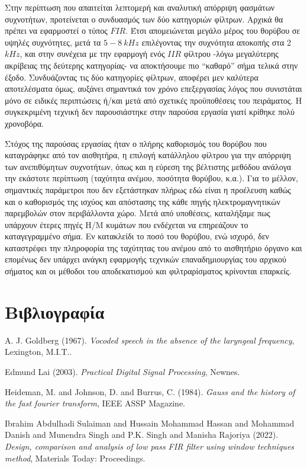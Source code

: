 \documentclass[breaklines=true, 12pt]{article}
\begin{document}
{{{Στην περίπτωση που απαιτείται λεπτομερή και αναλυτική απόρριψη φασμάτων
συχνοτήτων, προτείνεται ο συνδυασμός των δύο κατηγοριών φίλτρων. Αρχικά θα
πρέπει να εφαρμοστεί ο τύπος \(FIR\). Έτσι απομειώνεται μεγάλο μέρος του θορύβου
σε υψηλές συχνότητες, μετά τα \(5-8\ kHz\) επιλέγοντας την συχνότητα αποκοπής στα
2 \(kHz\), και στην συνέχεια με την εφαρμογή ενός \(IIR\) φίλτρου -λόγω μεγαλύτερης
ακρίβειας της δεύτερης κατηγορίας- να αποκτήσουμε πιο “καθαρό” σήμα τελικά στην
έξοδο. Συνδυάζοντας τις δύο κατηγορίες φίλτρων, αποφέρει μεν καλύτερα αποτελέσματα
όμως, αυξάνει σημαντικά τον χρόνο επεξεργασίας λόγος που συνιστάται μόνο σε
ειδικές περιπτώσεις ή/και μετά από σχετικές προϋποθέσεις του πειράματος. Η
συγκεκριμένη τεχνική δεν παρουσιάστηκε στην παρούσα εργασία γιατί κρίθηκε πολύ
χρονοβόρα.

Στόχος της παρούσας εργασίας ήταν ο πλήρης καθορισμός του θορύβου που
καταγράφηκε από τον αισθητήρα, η επιλογή κατάλληλου φίλτρου για την απόρριψη των
ανεπιθύμητων συχνοτήτων, όπως και η εύρεση της βέλτιστης μεθόδου ανάλογα την
εκάστοτε περίπτωση (ταχύτητα ανέμου, ποσότητα θορύβου, κ.α.). Για το μέλλον,
σημαντικές παράμετροι που δεν εξετάστηκαν πλήρως εδώ είναι η προέλευση καθώς και ο
καθορισμός της ισχύος και απόστασης της κάθε πηγής ηλεκτρομαγνητικών παρεμβολών
στον περιβάλλοντα χώρο. Μετά από υποθέσεις, καταλήξαμε πως υπάρχουν έτερες πηγές
Η/Μ κυμάτων που ενδέχεται να επηρεάζουν το καταγεγραμμένο σήμα. Εν κατακλείδι το
ποσό του θορύβου, ενώ ισχυρό, δεν καταστρέφει την πληροφορία της ταχύτητας του
ανέμου από το αισθητήριο όργανο και επομένως δεν υπάρχει ανάγκη εφαρμογής τεχνικών
επαναδημιουργίας του αρχικού σήματος και οι μέθοδοι του αποδεκατισμού και
φιλτραρίσματος κρίνονται επαρκείς.
\clearpage
\section{Βιβλιογραφία}
\label{sec:orga2c4f52}
\noindent
A. J. Goldberg (1967). \emph{Vocoded speech in the absence of the laryngeal frequency}, Lexington, M.I.T..

\noindent
Edmund Lai (2003). \emph{Practical Digital Signal Processing}, Newnes.

\noindent
Heideman, M. and Johnson, D. and Burrus, C. (1984). \emph{Gauss and the history of the fast fourier transform}, IEEE ASSP Magazine.

\noindent
Ibrahim Abdulhadi Sulaiman and Hussain Mohammad Hassan and Mohammad Danish and Munendra Singh and P.K. Singh and Manisha Rajoriya (2022). \emph{Design, comparison and analysis of low pass FIR filter using window techniques method}, Materials Today: Proceedings.

}}}
\end{document}

